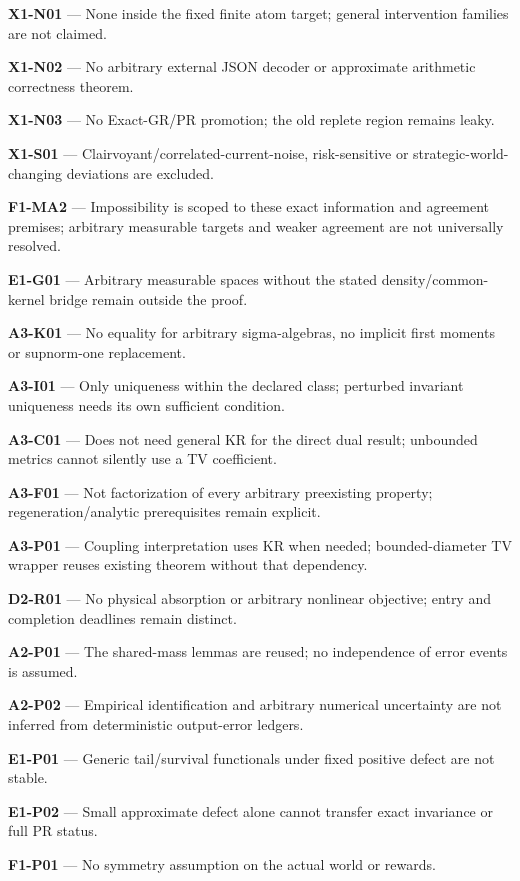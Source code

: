 \documentclass[
  11pt,
  a4paper,
]{article}
\begin{document}
\textbf{X1-N01} --- None inside the fixed finite atom target; general
intervention families are not claimed.

\textbf{X1-N02} --- No arbitrary external JSON decoder or approximate
arithmetic correctness theorem.

\textbf{X1-N03} --- No Exact-GR/PR promotion; the old replete region
remains leaky.

\textbf{X1-S01} --- Clairvoyant/correlated-current-noise, risk-sensitive
or strategic-world-changing deviations are excluded.

\textbf{F1-MA2} --- Impossibility is scoped to these exact information
and agreement premises; arbitrary measurable targets and weaker
agreement are not universally resolved.

\textbf{E1-G01} --- Arbitrary measurable spaces without the stated
density/common-kernel bridge remain outside the proof.

\textbf{A3-K01} --- No equality for arbitrary sigma-algebras, no
implicit first moments or supnorm-one replacement.

\textbf{A3-I01} --- Only uniqueness within the declared class; perturbed
invariant uniqueness needs its own sufficient condition.

\textbf{A3-C01} --- Does not need general KR for the direct dual result;
unbounded metrics cannot silently use a TV coefficient.

\textbf{A3-F01} --- Not factorization of every arbitrary preexisting
property; regeneration/analytic prerequisites remain explicit.

\textbf{A3-P01} --- Coupling interpretation uses KR when needed;
bounded-diameter TV wrapper reuses existing theorem without that
dependency.

\textbf{D2-R01} --- No physical absorption or arbitrary nonlinear
objective; entry and completion deadlines remain distinct.

\textbf{A2-P01} --- The shared-mass lemmas are reused; no independence
of error events is assumed.

\textbf{A2-P02} --- Empirical identification and arbitrary numerical
uncertainty are not inferred from deterministic output-error ledgers.

\textbf{E1-P01} --- Generic tail/survival functionals under fixed
positive defect are not stable.

\textbf{E1-P02} --- Small approximate defect alone cannot transfer exact
invariance or full PR status.

\textbf{F1-P01} --- No symmetry assumption on the actual world or
rewards.
\end{document}
